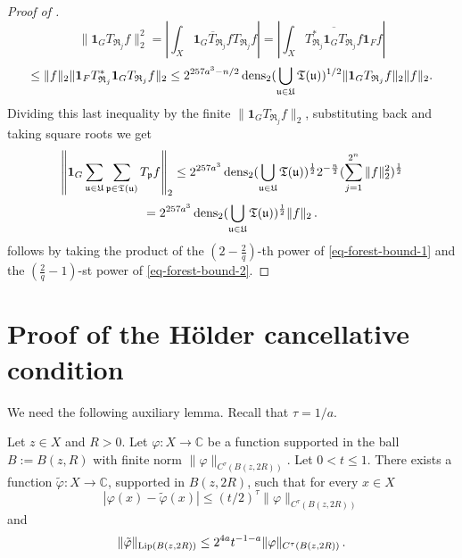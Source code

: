 \begin{proof}[Proof of ]
    $$
        \| \mathbf{1}_G T_{\mathfrak{R}_j} f \|_2^2 = \left| \int_X \overline{\mathbf{1}_G T_{\mathfrak{R}_j} f} T_{\mathfrak{R}_j} f \right| = \left| \int_X \overline{T_{\mathfrak{R}_j}^* \mathbf{1}_G T_{\mathfrak{R}_j} f} \mathbf{1}_F f \right|
    $$
    $$
        \le \|f\|_2 \| \mathbf{1}_F T_{\mathfrak{R}_j}^* \mathbf{1}_G T_{\mathfrak{R}_j} f \|_2 \le 2^{257a^3-n/2} \operatorname{\operatorname{dens}}_2(\bigcup_{{\mathfrak u}\in {\mathfrak U}}{\mathfrak T}({\mathfrak u}))^{1/2} \| \mathbf{1}_G T_{\mathfrak{R}_j} f \|_2 \|f\|_2.
    $$
    Dividing this last inequality by the finite $\| \mathbf{1}_G T_{\mathfrak{R}_j} f \|_2$, substituting back and taking square roots we get
    $$
        \left\|\mathbf{1}_G \sum_{{\mathfrak u} \in {\mathfrak U}} \sum_{{\mathfrak p} \in {\mathfrak T}({\mathfrak u})} T_{{\mathfrak p}} f\right\|_2 \le 2^{257a^3} \operatorname{\operatorname{dens}}_2(\bigcup_{{\mathfrak u}\in {\mathfrak U}}{\mathfrak T}({\mathfrak u}))^{\frac{1}{2}} 2^{-\frac{n}{2}} (\sum_{j = 1}^{2^n} \|f\|_2^2)^{\frac{1}{2}}
    $$
    \begin{equation}
        \label{eq-forest-bound-2}
        = 2^{257a^3} \operatorname{\operatorname{dens}}_2(\bigcup_{{\mathfrak u}\in {\mathfrak U}}{\mathfrak T}({\mathfrak u}))^{\frac{1}{2}} \|f\|_2\,.
    \end{equation}
     follows by taking the product of the $(2 - \frac{2}{q})$-th power of \eqref{eq-forest-bound-1} and the $(\frac{2}{q} - 1)$-st power of \eqref{eq-forest-bound-2}.
\end{proof}

\chapter{Proof of the H\"older cancellative condition}
\label{liphoel}

We need the following auxiliary lemma.
Recall that $\tau = 1/a$.

\begin{lemma}
    \label{Lipschitz-Holder-approximation}
    \leanok
    Let $z\in X$ and $R>0$. Let $\varphi: X \to \mathbb{C}$ be a function supported in the ball
    $B:=B(z,R)$ with finite norm $\|\varphi\|_{C^\tau(B(z, 2R))}$.
    Let $0<t \leq 1$. There exists a function $\tilde \varphi : X \to \mathbb{C}$, supported in $B(z,2R)$, such that for every $x\in X$
    \begin{equation}\label{eq-firstt}
        |\varphi(x) - \tilde \varphi(x)| \leq (t/2)^{\tau} \|\varphi\|_{C^\tau(B(z,2R))}
    \end{equation}and
   \begin{equation}\label{eq-secondt}
       \|\tilde \varphi\|_{\operatorname{\operatorname{Lip}}(B(z,2R))} \leq 2^{4a}t^{-1-a} \|\varphi\|_{C^{\tau}(B(z,2R))}\, .
   \end{equation}
\end{lemma}


